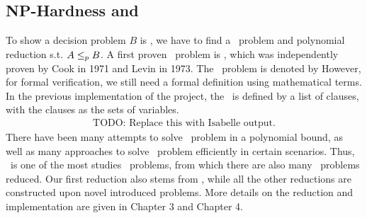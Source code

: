 \subsection{NP-Hardness and \SAT}
To show a decision problem $B$ is \NPH, 
we have to find a \NPH\ problem and polynomial reduction 
s.t. $A \leq_p B$. A first proven \NPH\ problem is \SAT, 
which was independently proven by Cook in 1971 and Levin in 1973. 
The \SAT\ problem is denoted by 
However, for formal verification, we still need a formal definition using mathematical terms. In the previous implementation of the project, the \SAT\ is defined by a list of clauses, with the clauses as the sets of variables.
\begin{align*}
    \text{TODO: Replace this with Isabelle output.}
\end{align*}
There have been many attempts to solve \SAT\ problem in a polynomial bound, as well as many approaches to solve \SAT\ problem efficiently in certain scenarios. Thus, \SAT\ is one of the most studies \NPH\ problems, from which there are also many \NPH\ problems reduced. Our first reduction also stems from \SAT, while all the other reductions are constructed upon novel introduced problems. More details on the reduction and implementation are given in Chapter 3 and Chapter 4. 
